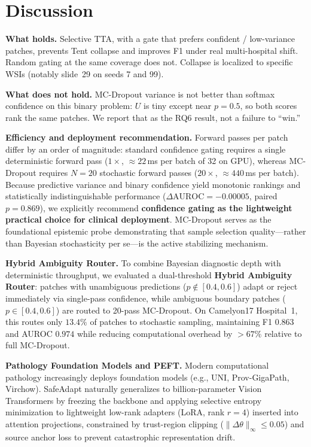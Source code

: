 \documentclass[conference]{IEEEtran}
\begin{document}
\section{Discussion}
\textbf{What holds.} Selective TTA, with a gate that prefers confident / low-variance patches, prevents Tent collapse and improves F1 under real multi-hospital shift.
Random gating at the same coverage does not.
Collapse is localized to specific WSIs (notably slide~29 on seeds 7 and 99).

\textbf{What does not hold.} MC-Dropout variance is not better than softmax confidence on this binary problem: $U$ is tiny except near $p{=}0.5$, so both scores rank the same patches.
We report that as the RQ6 result, not a failure to ``win.''

\textbf{Efficiency and deployment recommendation.} Forward passes per patch differ by an order of magnitude: standard confidence gating requires a single deterministic forward pass ($1\times$, $\approx 22$\,ms per batch of 32 on GPU), whereas MC-Dropout requires $N=20$ stochastic forward passes ($20\times$, $\approx 440$\,ms per batch). Because predictive variance and binary confidence yield monotonic rankings and statistically indistinguishable performance ($\Delta\text{AUROC} = -0.00005$, paired $p=0.869$), we explicitly recommend \textbf{confidence gating as the lightweight practical choice for clinical deployment}. MC-Dropout serves as the foundational epistemic probe demonstrating that sample selection quality—rather than Bayesian stochasticity per se—is the active stabilizing mechanism.

\textbf{Hybrid Ambiguity Router.} To combine Bayesian diagnostic depth with deterministic throughput, we evaluated a dual-threshold \textbf{Hybrid Ambiguity Router}: patches with unambiguous predictions ($p \notin [0.4, 0.6]$) adapt or reject immediately via single-pass confidence, while ambiguous boundary patches ($p \in [0.4, 0.6]$) are routed to 20-pass MC-Dropout. On Camelyon17 Hospital~1, this routes only $13.4\%$ of patches to stochastic sampling, maintaining F1 $0.863$ and AUROC $0.974$ while reducing computational overhead by $>67\%$ relative to full MC-Dropout.

\textbf{Pathology Foundation Models and PEFT.} Modern computational pathology increasingly deploys foundation models (e.g., UNI, Prov-GigaPath, Virchow). SafeAdapt naturally generalizes to billion-parameter Vision Transformers by freezing the backbone and applying selective entropy minimization to lightweight low-rank adapters (LoRA, rank $r=4$) inserted into attention projections, constrained by trust-region clipping ($\|\Delta \theta\|_\infty \le 0.05$) and source anchor loss to prevent catastrophic representation drift.
\end{document}
